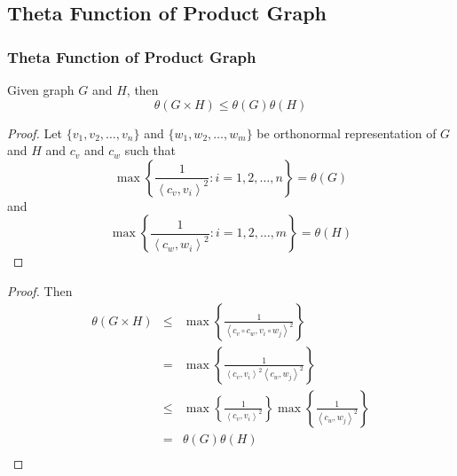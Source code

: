 \subsection{Theta Function of Product Graph}

      \begin{frame}
            \frametitle{Theta Function of Product Graph}
            \begin{lemma}
                  Given graph $ G $ and $ H $, then
                  \begin{equation}
                        \theta(G \times H) \leq \theta(G) \theta(H)
                  \end{equation}
            \end{lemma}

            \pause

            \begin{proof}
                  Let $ \{v_1, v_2, \dots, v_n\} $ and $ \{w_1, w_2, \dots, w_m\} $ be orthonormal representation of $ G $ and $ H $ and $ c_{v} $ and $ c_{w} $ such that
                  \begin{equation}
                        \max \left\{ \frac{1}{\left<c_{v},v_{i}\right>^2} : i=1,2,\dots,n \right\} = \theta(G)
                  \end{equation} 
                  and 
                  \begin{equation}
                        \max \left\{ \frac{1}{\left<c_{w},w_{i}\right>^2} : i=1,2,\dots,m \right\} = \theta(H)
                  \end{equation}
            \end{proof}
      \end{frame}

      \begin{frame}
            \begin{proof}
                  Then
                  \begin{eqnarray}
                        \theta(G \times H) &\leq& 
                        \max \left\{ \frac{1}{\left<c_{v} \circ c_{w},v_{i} \circ w_{j}\right>^2} \right\} \\
                        &=& \max \left\{ \frac{1}{\left<c_{v},v_{i}\right>^2 \left<c_{w},w_{j}\right>^2} \right\} \\
                        &\leq& \max \left\{ \frac{1}{\left<c_{v},v_{i}\right>^2} \right\} \max \left\{ \frac{1}{\left<c_{w},w_{j}\right>^2} \right\} \\
                        &=& \theta(G) \theta(H) \\
                  \end{eqnarray}
            \end{proof}
      \end{frame}

